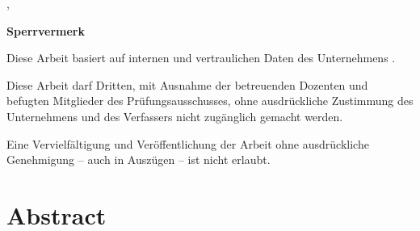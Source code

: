 \vspace{1cm}
\hsmaort, \hsmadatum \\

\vspace{1.2cm}
\hsmaautor

%
{%
  \vspace{11cm}
  \color{red}\textsf{\large\textbf{Sperrvermerk}}

  Diese Arbeit basiert auf internen und vertraulichen Daten des Unternehmens \hsmafirma.

  Diese Arbeit darf Dritten, mit Ausnahme der betreuenden Dozenten und befugten Mitglieder des Prüfungsausschusses, ohne ausdrückliche Zustimmung des Unternehmens und des Verfassers nicht zugänglich gemacht werden.

  Eine Vervielfältigung und Veröffentlichung der Arbeit ohne ausdrückliche Genehmigung -- auch in Auszügen -- ist nicht erlaubt.
  \color{black}
}{}

\cleardoublepage

\chapter*{Abstract}

%
{
  \subsubsection*{\hsmatitelde}
  \hsmaabstractde
  \begin{otherlanguage}{english}
    \subsubsection*{\hsmatitelen}
    \hsmaabstracten
  \end{otherlanguage}
}
{
  \subsubsection*{\hsmatitelen}
  \hsmaabstracten
  \begin{otherlanguage}{ngerman}
    \subsubsection*{\hsmatitelde}
    \hsmaabstractde
  \end{otherlanguage}
}

